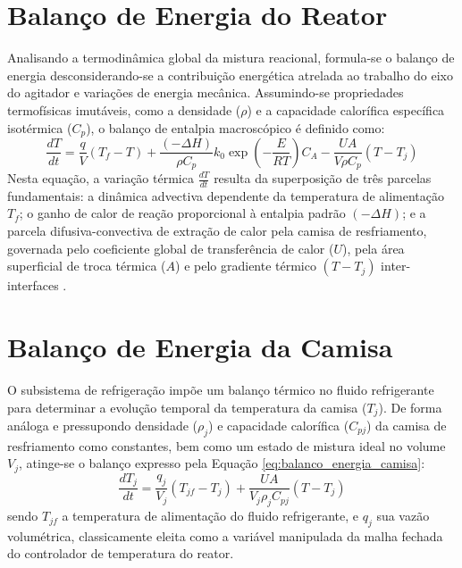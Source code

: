 \section{Balanço de Energia do Reator}
\label{sec:balanco_energia_reator}

Analisando a termodinâmica global da mistura reacional, formula-se o balanço de energia desconsiderando-se a contribuição energética atrelada ao trabalho do eixo do agitador e variações de energia mecânica. Assumindo-se propriedades termofísicas imutáveis, como a densidade ($\rho$) e a capacidade calorífica específica isotérmica ($C_p$), o balanço de entalpia macroscópico é definido como:
\begin{equation}
\label{eq:balanco_energia_reator}
\frac{dT}{dt} = \frac{q}{V}(T_f - T) + \frac{(-\Delta H)}{\rho C_p} k_0 \exp\left(-\frac{E}{RT}\right) C_A - \frac{UA}{V \rho C_p}(T - T_j)
\end{equation}
Nesta equação, a variação térmica $\frac{dT}{dt}$ resulta da superposição de três parcelas fundamentais: a dinâmica advectiva dependente da temperatura de alimentação $T_f$; o ganho de calor de reação proporcional à entalpia padrão $(-\Delta H)$; e a parcela difusiva-convectiva de extração de calor pela camisa de resfriamento, governada pelo coeficiente global de transferência de calor ($U$), pela área superficial de troca térmica ($A$) e pelo gradiente térmico $(T - T_j)$ inter-interfaces \cite{Fogler2016}.

\section{Balanço de Energia da Camisa}
\label{sec:balanco_energia_camisa}

O subsistema de refrigeração impõe um balanço térmico no fluido refrigerante para determinar a evolução temporal da temperatura da camisa ($T_j$). De forma análoga e pressupondo densidade ($\rho_j$) e capacidade calorífica ($C_{pj}$) da camisa de resfriamento como constantes, bem como um estado de mistura ideal no volume $V_j$, atinge-se o balanço expresso pela Equação \ref{eq:balanco_energia_camisa}:
\begin{equation}
\label{eq:balanco_energia_camisa}
\frac{dT_j}{dt} = \frac{q_j}{V_j}(T_{jf} - T_j) + \frac{UA}{V_j \rho_j C_{pj}}(T - T_j)
\end{equation}
sendo $T_{jf}$ a temperatura de alimentação do fluido refrigerante, e $q_j$ sua vazão volumétrica, classicamente eleita como a variável manipulada da malha fechada do controlador de temperatura do reator.

